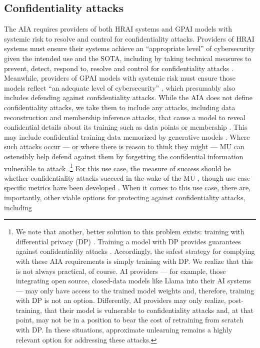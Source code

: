 \subsection{Confidentiality attacks} 
\vspace{-0.2cm}
The AIA requires providers of both HRAI systems and GPAI models with systemic risk to resolve and control for confidentiality attacks. Providers of HRAI systems must ensure their systems achieve an ``appropriate level'' of cybersecurity given the intended use and the SOTA, including by taking technical measures to prevent, detect, respond to, resolve and control for confidentiality attacks \citep[Art. 15.5; Rec. 74]{european_union_ai_act_2024}. Meanwhile, providers of GPAI models with systemic risk must ensure those models reflect ``an adequate level of cybersecurity'' \citep[Art. 55.d]{european_union_ai_act_2024}, which presumably also includes defending against confidentiality attacks. While the AIA does not define confidentiality attacks, we take them to include any attacks, including data reconstruction and membership inference attacks, that cause a model to reveal confidential details about its training such as data points or membership \citep{vassilev2023adversarial, CLTC2024adversarial}. This may include confidential training data memorized by generative models \citet{cooper2024machineunlearningdoesntthink, gu2024secondorderinformationmattersrevisiting, lucki2024adversarialperspectivemachineunlearning}. Where such attacks occur --- or where there is reason to think they might --- MU can ostensibly help defend against them by forgetting the confidential information vulnerable to attack \citep{hine_supporting_2024, neel2024machineunlearning, carlini2022privacyonioneffectmemorization, math12244001, xu2024machineunlearningtraditionalmodels, reuel2024openproblemstechnicalai, barez2025openproblemsmachineunlearning}.\footnote{We note that another, better solution to this problem exists: training with differential privacy (DP) \citep{Protivash_Durrell_Kifer_Ding_Zhang_2024}. Training a model with DP provides guarantees against confidentiality attacks \citep{chen2021differential, Protivash_Durrell_Kifer_Ding_Zhang_2024}. Accordingly, the safest strategy for complying with these AIA requirements is simply training with DP. We realize that this is not always practical, of course. AI providers --- for example, those integrating open source, closed-data models like Llama \citep{touvron2023llama} into their AI systems --- may only have access to the trained model weights and, therefore, training with DP is not an option. Differently, AI providers may only realize, post-training, that their model is vulnerable to confidentiality attacks and, at that point, may not be in a position to bear the cost of retraining from scratch with DP. In these situations, approximate unlearning remains a highly relevant option for addressing these attacks.} For this use case, the measure of success should be whether confidentiality attacks succeed in the wake of the MU \cite{grimes2024goneforgottenimprovedbenchmarks}, though use case-specific metrics have been developed \citet{maini2024tofutaskfictitiousunlearning}. When it comes to this use case, there are, importantly, other viable options for protecting against confidentiality attacks, including 